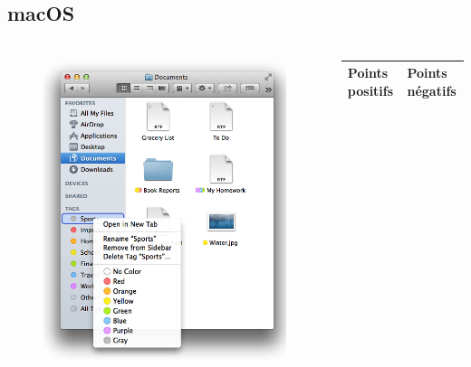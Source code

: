 \documentclass[10pt]{beamer}
\begin{document}
\subsection{macOS}
\begin{frame}
    \frametitle{\subsecname}
    \begin{columns}[T]
        \begin{column}{.4\textwidth}
            \begin{center}
                \begin{figure}
                    \includegraphics[width=1\textwidth]{images/macos_tags.png}
                \end{figure}
            \end{center}
        \end{column}
        \pause
        \begin{column}{.6\textwidth}
            \begin{center}
                \begin{tabularx}{6cm}{|X|X|} \hline
                    \textbf{Points positifs} & \textbf{Points négatifs} \\ \hline

\end{tabularx}
\end{center}
\end{column}
\end{columns}
\end{frame}
\end{document}
